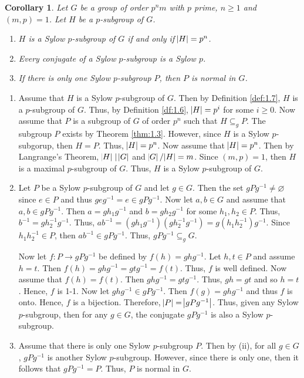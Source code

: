 \documentclass{article}
\makeatletter
\newtheorem{corollary}{Corollary}[theorem]
\theoremstyle{definition}
\theoremstyle{remark}
\let\oldproofname=\proofname
\renewcommand{\proofname}{\bf{\textit{\oldproofname}}}
\theoremstyle{definition}
\renewenvironment{proof}[1][\proofname]{\par
  \pushQED{\qed}%
  \normalfont \topsep6\p@\@plus6\p@\relax
  \list{}{\leftmargin=0mm
          \rightmargin=0mm
          \settowidth{\itemindent}{\itshape#1}%
          \labelwidth=4mm
          \parsep=0pt \listparindent=0mm%
  }
  \item[\hskip\labelsep
        \itshape
    #1\@addpunct{.}]\ignorespaces
}{%
  \popQED\endlist\@endpefalse
}
\makeatother
\begin{document}
    \newpage
        
    \begin{corollary}\label{cor:1.3.1}
        Let $G$ be a group of order $p^nm$ with $p$ prime, $n\geq 1$ and $(m,p)=1$. Let $H$ be a $p$-subgroup of $G$.
        \begin{enumerate}[label=(\roman*)]
            \item $H$ is a Sylow $p$-subgroup of $G$ if and only if $\abs{H}=p^n$.
            \item Every conjugate of a Sylow $p$-subgroup is a Sylow $p$.
            \item If there is only one Sylow $p$-subgroup $P$, then $P$ is normal in $G$.
        \end{enumerate}
    \end{corollary}
        \begin{proof}\hfill\par
            \begin{enumerate}[label=(\roman*)]
                \item Assume that $H$ is a Sylow $p$-subgroup of $G$. Then by Definition \ref{def:1.7}, $H$ is a $p$-subgroup of $G$. Thus, by Definition \ref{df:1.6}, $\abs{H}=p^i$ for some $i\geq 0$. Now assume that $P$ is a subgroup of $G$ of order $p^n$ such that $H\subseteq_g P$. The subgroup $P$ exists by Theorem \ref{thm:1.3}. However, since $H$ is a Sylow $p$-subgorup, then $H=P$. Thus, $\abs{H}=p^n$. Now assume that $\abs{H}=p^n$. Then by Langrange's Theorem, $\abs{H}\mid\abs{G}$ and $\abs{G}/\abs{H}=m$. Since $(m,p)=1$, then $H$ is a maximal $p$-subgroup of $G$. Thus, $H$ is a Sylow $p$-subgroup of $G$.
                \item Let $P$ be a Sylow $p$-subgroup of $G$ and let $g\in G$. Then the set $gPg^{-1}\neq\varnothing$ since $e\in P$ and thus $geg^{-1}=e\in gPg^{-1}$. Now let $a,b\in G$ and assume that $a,b\in gPg^{-1}$. Then $a=gh_1g^{-1}$ and $b=gh_2g^{-1}$ for some $h_1,h_2\in P$. Thus, $b^{-1}=gh_2^{-1}g^{-1}$. Thus, $ab^{-1}=(gh_1g^{-1})(gh_2^{-1}g^{-1})=g(h_1h_2^{-1})g^{-1}$. Since $h_1h_2^{-1}\in P$, then $ab^{-1}\in gPg^{-1}$. Thus, $gPg^{-1}\subseteq_g G$.\par\hspace{4mm} Now let $f\colon P\rightarrow gPg^{-1}$ be defined by $f(h)=ghg^{-1}$. Let $h,t\in P$ and assume $h=t$. Then $f(h)=ghg^{-1}=gtg^{-1}=f(t)$. Thus, $f$ is well defined. Now assume that $f(h)=f(t)$. Then $ghg^{-1}=gtg^{-1}$. Thus, $gh=gt$ and so $h=t$. Hence, $f$ is 1-1. Now let $ghg^{-1}\in gPg^{-1}$. Then $f(g)=ghg^{-1}$ and thus $f$ is onto. Hence, $f$ is a bijection. Therefore, $\abs{P}=\abs{gPg^{-1}}$. Thus, given any Sylow $p$-subgroup, then for any $g\in G$, the conjugate $gPg^{-1}$ is also a Sylow $p$-subgroup.
                \item Assume that there is only one Sylow $p$-subgroup $P$. Then by (ii), for all $g\in G$, $gPg^{-1}$ is another Sylow $p$-subgroup. However, since there is only one, then it follows that $gPg^{-1}=P$. Thus, $P$ is normal in $G$.
            \end{enumerate}
        \end{proof}
        
\end{document}
